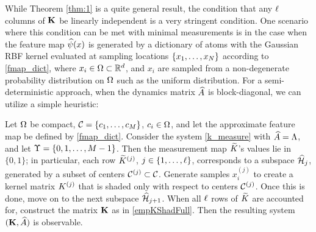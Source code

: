 While Theorem \ref{thm:1} is a quite general result, the condition that any $\ell$ columns of $\mathbf{K}$ be linearly independent is a very stringent condition. 
One scenario where this condition can be met with minimal measurements is in the case when the feature map $\widehat{\psi}(x)$ is generated by a dictionary of atoms with the Gaussian RBF kernel evaluated at sampling locations $\{x_1, \dots, x_{N}\}$ according to \eqref{fmap_dict}, where $x_i\in\Omega\subset\mathbb{R}^d$, and $x_i$ are sampled from a non-degenerate probability distribution on $\Omega$ such as the uniform distribution. For a semi-deterministic approach, when the dynamics matrix $\widehat{A}$ is block-diagonal, we can utilize a simple heuristic:
\begin{remark}\label{rem:1}
 Let $\Omega$ be compact, $\mathcal{C} = \{c_1,\dots,c_{M}\}$, $c_i\in\Omega$, and let the approximate feature map be defined by \eqref{fmap_dict}. Consider the system \eqref{k_measure} with $\widehat{A}=\Lambda$, and let $\Upsilon = \{0,1,\dots,M-1\}$. Then the measurement map $\widetilde{K}$'s values lie in $\{0, 1\}$; in particular, each row $\widetilde{K}^{(j)}$, $j\in\{1,\dots,\ell\}$, corresponds to a subspace $\widehat{\mathcal{H}}_{j}$, generated by a subset of centers $\mathcal{C}^{(j)}\subset\mathcal{C}$. Generate samples $x_i^{(j)}$ to create a kernel matrix $K^{(j)}$ that is shaded only with respect to centers $\mathcal{C}^{(j)}$. Once this is done, move on to the next subspace $\widehat{\mathcal{H}}_{j+1}$. When all $\ell$ rows of $\widetilde{K}$ are accounted for, construct the matrix $\mathbf{K}$ as in \eqref{empKShadFull}. Then the resulting system $(\mathbf{K}, \widehat{A})$ is observable. 
\end{remark}

